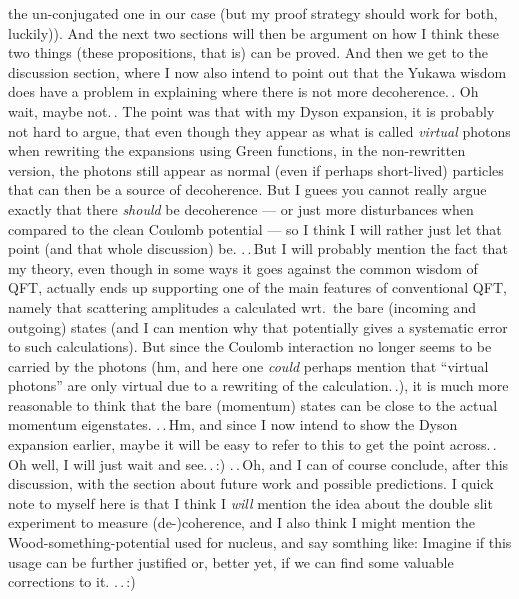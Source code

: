 \documentclass{report}
\begin{document}
the un-conjugated one in our case (but my proof strategy should work for both, luckily)). And the next two sections will then be argument on how I think these two things (these propositions, that is) can be proved. And then we get to the discussion section, where I now also intend to point out that the Yukawa wisdom does have a problem in explaining where there is not more decoherence.\,. Oh wait, maybe not.\,. The point was that with my Dyson expansion, it is probably not hard to argue, that even though they appear as what is called \emph{virtual} photons when rewriting the expansions using Green functions, in the non-rewritten version, the photons still appear as normal (even if perhaps short-lived) particles that can then be a source of decoherence. But I guees you cannot really argue exactly that there \emph{should} be decoherence --- or just more disturbances when compared to the clean Coulomb potential --- so I think I will rather just let that point (and that whole discussion) be. .\,.\,But I will probably mention the fact that my theory, even though in some ways it goes against the common wisdom of QFT, actually ends up supporting one of the main features of conventional QFT, namely that scattering amplitudes a calculated wrt.\ the bare (incoming and outgoing) states (and I can mention why that potentially gives a systematic error to such calculations). But since the Coulomb interaction no longer seems to be carried by the photons (hm, and here one \emph{could} perhaps mention that ``virtual photons'' are only virtual due to a rewriting of the calculation.\,.), it is much more reasonable to think that the bare (momentum) states can be close to the actual momentum eigenstates. .\,.\,Hm, and since I now intend to show the Dyson expansion earlier, maybe it will be easy to refer to this to get the point across.\,. Oh well, I will just wait and see.\,.\,:) .\,.\,Oh, and I can of course conclude, after this discussion, with the section about future work and possible predictions. I quick note to myself here is that I think I \emph{will} mention the idea about the double slit experiment to measure (de-)coherence, and I also think I might mention the Wood-something-potential used for nucleus, and say somthing like: Imagine if this usage can be further justified or, better yet, if we can find some valuable corrections to it. .\,.\,:)
\end{document}

